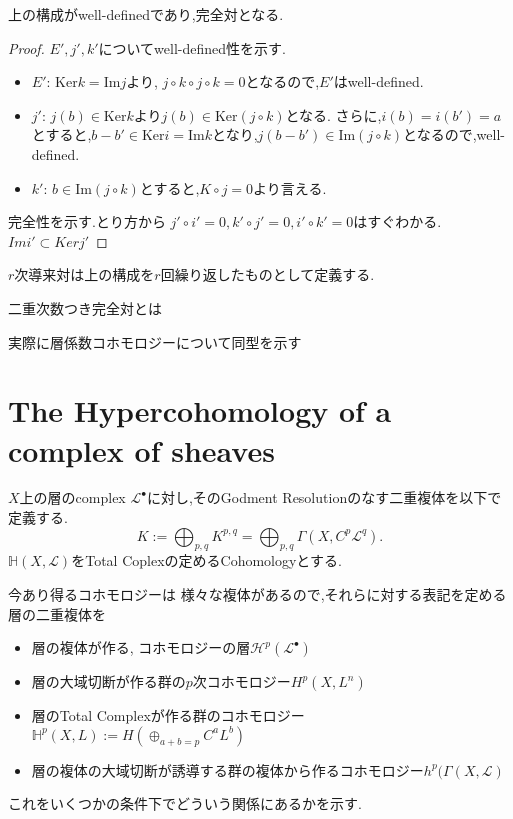 \begin{prop}
上の構成がwell-definedであり,完全対となる.
\end{prop}
\begin{proof}
$E',j',k'$についてwell-defined性を示す.
\begin{itemize}
    \item $E'$: 
$\mathrm{Ker}k = \mathrm{Im}j $より, $j \circ k\circ j \circ k = 0$となるので,$E'$はwell-defined.
\item $j'$:
$j(b) \in \mathrm{Ker}k$より$j(b) \in \mathrm{Ker}(j \circ k)$となる.
さらに,$i(b)=i(b')=a$とすると,$b-b' \in \mathrm{Ker}i = \mathrm{Im} k$となり,$j(b-b') \in \mathrm{Im}(j \circ k)$となるので,well-defined.
\item $k'$: $b \in \mathrm{Im}(j \circ k)$とすると,$K \circ j = 0$より言える.
\end{itemize}
完全性を示す.とり方から
$j'\circ i' = 0, k' \circ j' =0, i' \circ k' = 0$はすぐわかる.
$Im i' \subset Ker j'$

\end{proof}


$r$次導来対は上の構成を$r$回繰り返したものとして定義する.

\begin{dfn}
二重次数つき完全対とは
\end{dfn}

実際に層係数コホモロジーについて同型を示す

\section{The Hypercohomology of a complex of sheaves}
$X$上の層のcomplex $\mathcal{L}^{\bullet}$に対し,そのGodment Resolutionのなす二重複体を以下で定義する.
\begin{equation*}
K := \bigoplus_{p,q} K^{p,q} = \bigoplus_{p,q} \Gamma(X, C^p \mathcal{L}^q).
\end{equation*}
$\mathbb{H}(X, \mathcal{L})$をTotal Coplexの定めるCohomologyとする.

今あり得るコホモロジーは
様々な複体があるので,それらに対する表記を定める
層の二重複体を
\begin{itemize}
    \item 層の複体が作る, コホモロジーの層$\mathcal{H}^p(\mathcal{L}^{\bullet})$
    \item 層の大域切断が作る群の$p$次コホモロジー$H^p(X,L^n)$
    \item 層のTotal Complexが作る群のコホモロジー$\mathbb{H}^p(X,L):= H(\oplus_{a+b=p} C^{a}L^{b})$
    \item 層の複体の大域切断が誘導する群の複体から作るコホモロジー$h^p(\Gamma(X, \mathcal{L})$
\end{itemize}
これをいくつかの条件下でどういう関係にあるかを示す.


